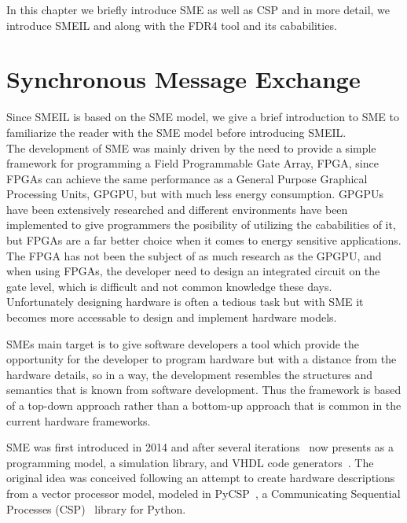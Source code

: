In this chapter we briefly introduce SME as well as CSP and in more detail, we introduce SMEIL and \cspm along with the FDR4 tool and its cababilities.

\section{Synchronous Message Exchange}
Since SMEIL is based on the SME model, we give a brief introduction to SME to familiarize the reader with the SME model before introducing SMEIL.
\\

The development of SME was mainly driven by the need to provide a simple framework for programming a Field Programmable Gate
Array, FPGA, since FPGAs can achieve the same performance as a General Purpose Graphical Processing Units, GPGPU, but with much less energy consumption. GPGPUs have been extensively researched and different environments have been implemented to give programmers the posibility of utilizing the cababilities of it, but FPGAs are a far better choice when it comes to energy sensitive applications. The FPGA has not been the subject of as much research as the GPGPU, and when using FPGAs, the developer need to design an integrated circuit on the gate level, which is difficult and not common knowledge these days.
Unfortunately designing hardware is often a tedious task but with SME it becomes more accessable to design and implement hardware models.

SMEs main target is to give software developers a tool which provide the opportunity for the developer to program hardware but with a distance from the hardware details, so in a way, the development resembles the structures and semantics that is known from software development.
Thus the framework is based of a top-down approach rather than a bottom-up approach that is common in the current hardware frameworks.

SME was first introduced in 2014 and after several iterations~\cite{Vinter2014, Vinter2015, Skovhede} now presents as a programming model, a simulation library, and VHDL code generators~\cite{vhdl}. The original idea was conceived following an attempt to create hardware descriptions from a vector processor model, modeled in PyCSP~\cite{bjorndalen2007pycsp},
a Communicating Sequential Processes (CSP)~\cite{hoare1978communicating} library for Python.\\

